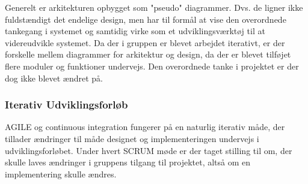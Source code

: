 Generelt er arkitekturen opbygget som "pseudo" diagrammer. Dvs. de ligner ikke fuldstændigt det endelige design, men har til formål at vise den overordnede tankegang i systemet og samtidig virke som et udviklingsværktøj til at videreudvikle systemet. Da der i gruppen er blevet arbejdet iterativt, er der forskelle mellem diagrammer for arkitektur og design, da der er blevet tilføjet flere moduler og funktioner undervejs. Den overordnede tanke i projektet er der dog ikke blevet ændret på.

\subsubsection{Iterativ Udviklingsforløb}

AGILE og continuous integration fungerer på en naturlig iterativ måde, der tillader 
ændringer til måde designet og implementeringen undervejs i udviklingsforløbet.
Under hvert SCRUM møde er der taget stilling til om, der skulle laves ændringer i 
gruppens tilgang til projektet, altså om en implementering skulle ændres. \\




